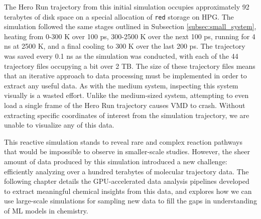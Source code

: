 The Hero Run trajectory from this initial simulation occupies approximately 92 terabytes of disk space on a special allocation of \verb|red| storage on HPG. 
The simulation followed the same stages outlined in Subsection \ref{subsec:small_system}, heating from 0-300 K over 100 ps, 300-2500 K over the next 100 ps, running for 4 ns at 2500 K, and a final cooling to 300 K over the last 200 ps.
The trajectory was saved every 0.1 ns as the simulation was conducted, with each of the 44 trajectory files occupying a bit over 2 TB.
The size of these trajectory files means that an iterative approach to data processing must be implemented in order to extract any useful data. 
As with the medium system, inspecting this system visually is a wasted effort.
Unlike the medium-sized system, attempting to even load a single frame of the Hero Run trajectory causes VMD to crash.
Without extracting specific coordinates of interest from the simulation trajectory, we are unable to visualize any of this data.

This reactive simulation stands to reveal rare and complex reaction pathways that would be impossible to observe in smaller-scale studies. 
However, the sheer amount of data produced by this simulation introduced a new challenge: efficiently analyzing over a hundred terabytes of molecular trajectory data. 
The following chapter details the GPU-accelerated data analysis pipelines developed to extract meaningful chemical insights from this data, and explores how we can use large-scale simulations for sampling new data to fill the gaps in understanding of ML models in chemistry. 
